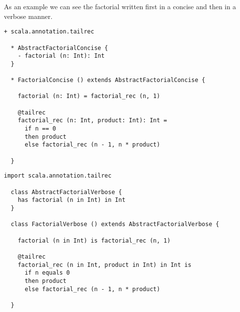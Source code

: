 \documentclass[12pt,a4paper]{article}
\begin{document}
    As an example we can see the factorial written first in a concise and then in a verbose manner.

    \begin{lstlisting}[label={lst:exampleFactorialConcise}]
  + scala.annotation.tailrec

  * AbstractFactorialConcise {
    - factorial (n: Int): Int
  }

  * FactorialConcise () extends AbstractFactorialConcise {

    factorial (n: Int) = factorial_rec (n, 1)

    @tailrec
    factorial_rec (n: Int, product: Int): Int =
      if n == 0
      then product
      else factorial_rec (n - 1, n * product)

  }
    \end{lstlisting}


    \begin{lstlisting}[label={lst:exampleFactorialVerbose}]
  import scala.annotation.tailrec

  class AbstractFactorialVerbose {
    has factorial (n in Int) in Int
  }

  class FactorialVerbose () extends AbstractFactorialVerbose {

    factorial (n in Int) is factorial_rec (n, 1)

    @tailrec
    factorial_rec (n in Int, product in Int) in Int is
      if n equals 0
      then product
      else factorial_rec (n - 1, n * product)

  }
    \end{lstlisting}
\end{document}
